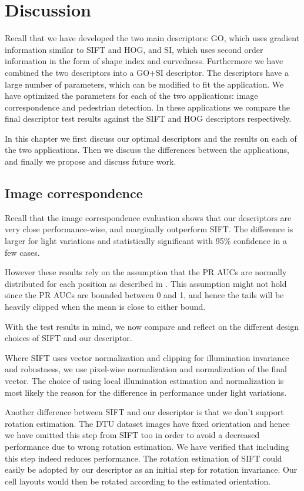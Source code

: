 \documentclass[thesis.tex]{subfiles}
\begin{document}
\chapter{Discussion}

Recall that we have developed the two main descriptors: GO, which uses gradient information similar to SIFT and HOG, and SI, which uses second order information in the form of shape index and curvedness. Furthermore we have combined the two descriptors into a GO+SI descriptor. The descriptors have a large number of parameters, which can be modified to fit the application. We have optimized the parameters for each of the two applications: image correspondence and pedestrian detection. In these applications we compare the final descriptor test results against the SIFT and HOG descriptors respectively.

In this chapter we first discuss our optimal descriptors and the results on each of the two applications. Then we discuss the differences between the applications, and finally we propose and discuss future work.

\section{Image correspondence}
\label{sec:discussionIc}
Recall that the image correspondence evaluation shows that our descriptors are very close performance-wise, and marginally outperform SIFT. The difference is larger for light variations and statistically significant with 95\% confidence in a few cases.

However these results rely on the assumption that the PR AUCs are normally distributed for each position as described in . This assumption might not hold since the PR AUCs are bounded between 0 and 1, and hence the tails will be heavily clipped when the mean is close to either bound.

With the test results in mind, we now compare and reflect on the different design choices of SIFT and our descriptor.

Where SIFT uses vector normalization and clipping for illumination invariance and robustness, we use pixel-wise normalization and normalization of the final vector. The choice of using local illumination estimation and normalization is most likely the reason for the difference in performance under light variations.

Another difference between SIFT and our descriptor is that we don't support rotation estimation. The DTU dataset images have fixed orientation and hence we have omitted this step from SIFT too in order to avoid a decreased performance due to wrong rotation estimation. We have verified that including this step indeed reduces performance. The rotation estimation of SIFT could easily be adopted by our descriptor as an initial step for rotation invariance. Our cell layouts would then be rotated according to the estimated orientation.
\end{document}
